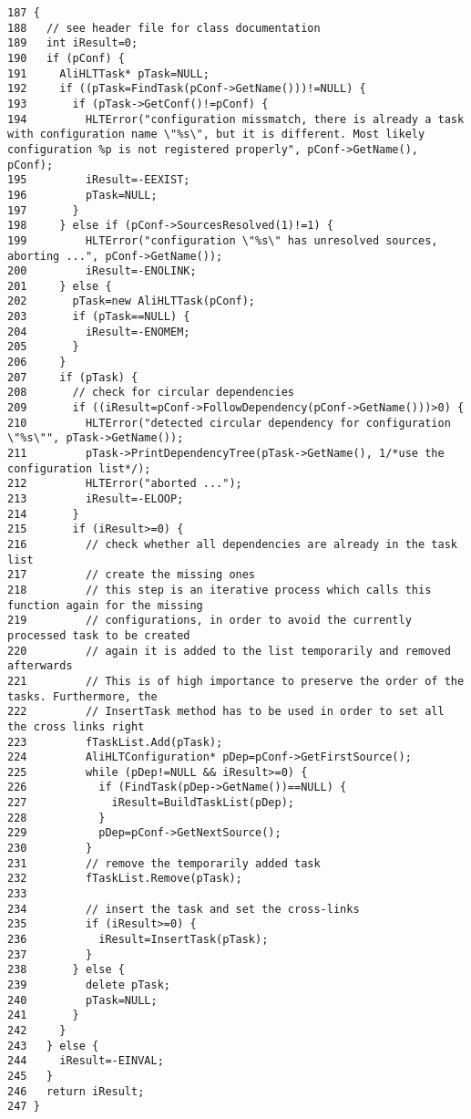 \footnotesize\begin{verbatim}187 {
188   // see header file for class documentation
189   int iResult=0;
190   if (pConf) {
191     AliHLTTask* pTask=NULL;
192     if ((pTask=FindTask(pConf->GetName()))!=NULL) {
193       if (pTask->GetConf()!=pConf) {
194         HLTError("configuration missmatch, there is already a task with configuration name \"%s\", but it is different. Most likely configuration %p is not registered properly", pConf->GetName(), pConf);
195         iResult=-EEXIST;
196         pTask=NULL;
197       }
198     } else if (pConf->SourcesResolved(1)!=1) {
199         HLTError("configuration \"%s\" has unresolved sources, aborting ...", pConf->GetName());
200         iResult=-ENOLINK;
201     } else {
202       pTask=new AliHLTTask(pConf);
203       if (pTask==NULL) {
204         iResult=-ENOMEM;
205       }
206     }
207     if (pTask) {
208       // check for circular dependencies
209       if ((iResult=pConf->FollowDependency(pConf->GetName()))>0) {
210         HLTError("detected circular dependency for configuration \"%s\"", pTask->GetName());
211         pTask->PrintDependencyTree(pTask->GetName(), 1/*use the configuration list*/);
212         HLTError("aborted ...");
213         iResult=-ELOOP;
214       }
215       if (iResult>=0) {
216         // check whether all dependencies are already in the task list
217         // create the missing ones
218         // this step is an iterative process which calls this function again for the missing
219         // configurations, in order to avoid the currently processed task to be created
220         // again it is added to the list temporarily and removed afterwards
221         // This is of high importance to preserve the order of the tasks. Furthermore, the
222         // InsertTask method has to be used in order to set all the cross links right 
223         fTaskList.Add(pTask);
224         AliHLTConfiguration* pDep=pConf->GetFirstSource();
225         while (pDep!=NULL && iResult>=0) {
226           if (FindTask(pDep->GetName())==NULL) {
227             iResult=BuildTaskList(pDep);
228           }
229           pDep=pConf->GetNextSource();
230         }
231         // remove the temporarily added task
232         fTaskList.Remove(pTask);
233 
234         // insert the task and set the cross-links
235         if (iResult>=0) {
236           iResult=InsertTask(pTask);
237         }
238       } else {
239         delete pTask;
240         pTask=NULL;
241       }
242     }
243   } else {
244     iResult=-EINVAL;
245   }
246   return iResult;
247 }
\end{verbatim}\normalsize 


